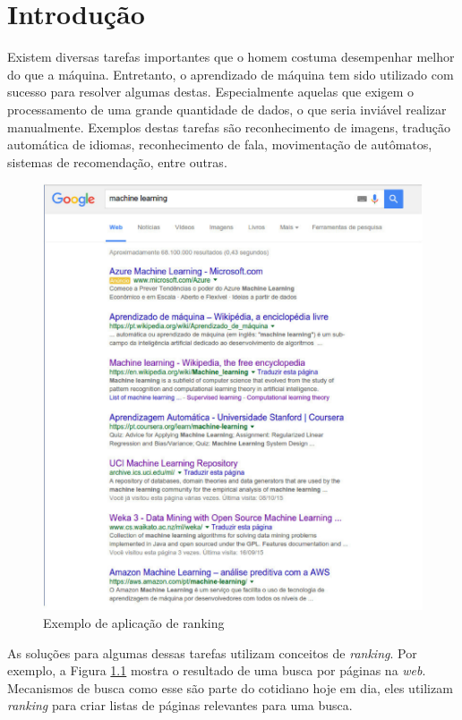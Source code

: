 \chapter{Introdução}

Existem diversas tarefas importantes que o homem costuma desempenhar melhor do que a máquina.
Entretanto, o aprendizado de máquina tem sido utilizado com sucesso para resolver algumas destas.
Especialmente aquelas que exigem o processamento de uma grande quantidade de dados, o que seria inviável realizar manualmente.
Exemplos destas tarefas são reconhecimento de imagens, tradução automática de idiomas, reconhecimento de fala, movimentação de autômatos, sistemas de recomendação, entre outras.

\begin{figure}[h!]
  \includegraphics[width=\linewidth]{images/intro01.eps}
  \caption{Exemplo de aplicação de ranking}
  \label{fig:metodoproposto01}
\end{figure}

As soluções para algumas dessas tarefas utilizam conceitos de \textit{ranking}.
Por exemplo, a Figura \ref{fig:metodoproposto01} mostra o resultado de uma busca por páginas na \textit{web}.
Mecanismos de busca como esse são parte do cotidiano hoje em dia, eles utilizam \textit{ranking} para criar listas de páginas relevantes para uma busca.

